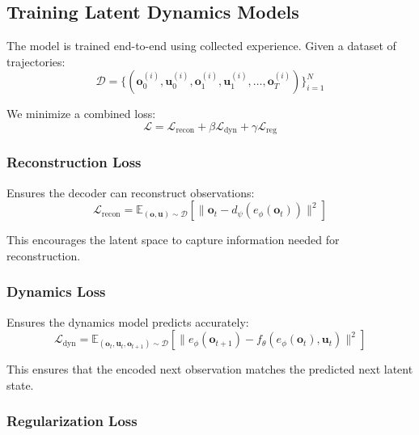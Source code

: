 \subsection{Training Latent Dynamics Models}

The model is trained end-to-end using collected experience. Given a dataset of trajectories:
\begin{equation}
\mathcal{D} = \{(\mathbf{o}_0^{(i)}, \mathbf{u}_0^{(i)}, \mathbf{o}_1^{(i)}, \mathbf{u}_1^{(i)}, \ldots, \mathbf{o}_T^{(i)})\}_{i=1}^N
\end{equation}

We minimize a combined loss:
\begin{equation}
\mathcal{L} = \mathcal{L}_{\text{recon}} + \beta \mathcal{L}_{\text{dyn}} + \gamma \mathcal{L}_{\text{reg}}
\label{eq:latent_model_loss}
\end{equation}

\subsubsection{Reconstruction Loss}

Ensures the decoder can reconstruct observations:
\begin{equation}
\mathcal{L}_{\text{recon}} = \mathbb{E}_{(\mathbf{o}, \mathbf{u}) \sim \mathcal{D}} \left[ \| \mathbf{o}_t - d_\psi(e_\phi(\mathbf{o}_t)) \|^2 \right]
\end{equation}

This encourages the latent space to capture information needed for reconstruction.

\subsubsection{Dynamics Loss}

Ensures the dynamics model predicts accurately:
\begin{equation}
\mathcal{L}_{\text{dyn}} = \mathbb{E}_{(\mathbf{o}_t, \mathbf{u}_t, \mathbf{o}_{t+1}) \sim \mathcal{D}} \left[ \| e_\phi(\mathbf{o}_{t+1}) - f_\theta(e_\phi(\mathbf{o}_t), \mathbf{u}_t) \|^2 \right]
\end{equation}

This ensures that the encoded next observation matches the predicted next latent state.

\subsubsection{Regularization Loss}

